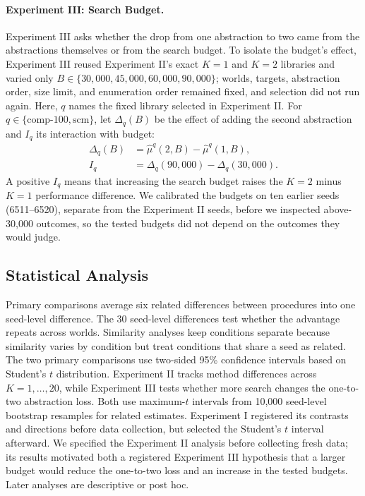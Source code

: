 \documentclass[10pt]{article}
\begin{document}
\paragraph{Experiment III: Search Budget.}
Experiment III asks whether the drop from one abstraction to two came from
the abstractions themselves or from the search budget. To isolate the
budget's effect, Experiment III reused Experiment II's exact $K=1$ and $K=2$
libraries and varied only $B\in\{30{,}000,45{,}000,60{,}000,90{,}000\}$;
worlds, targets, abstraction order, size limit, and enumeration order
remained fixed, and selection did not run again. Here, $q$ names the fixed
library selected in Experiment II. For
$q\in\{\mathrm{comp\text{-}100},\mathrm{scm}\}$, let $\Delta_q(B)$ be the
effect of adding the second abstraction and $I_q$ its interaction with
budget:
\begin{equation}
  \begin{aligned}
    \Delta_q(B)
      &=\widehat\mu^q(2,B)-\widehat\mu^q(1,B),\\
    I_q
      &=\Delta_q(90{,}000)-\Delta_q(30{,}000).
  \end{aligned}
\end{equation}
A positive $I_q$ means that increasing the search budget raises the $K=2$ minus
$K=1$ performance difference. We calibrated the budgets on ten earlier
seeds (6511--6520), separate from the Experiment II seeds, before we
inspected above-30,000 outcomes, so the tested budgets did not depend on the
outcomes they would judge.

\subsection{Statistical Analysis}

Primary comparisons average six related differences between procedures into
one seed-level difference. The 30 seed-level differences test whether the
advantage repeats across worlds. Similarity analyses keep conditions separate
because similarity varies by condition but treat conditions that share a seed
as related. The two primary comparisons use two-sided 95\% confidence
intervals based on Student's $t$ distribution. Experiment
II tracks method differences across $K=1,\ldots,20$, while Experiment III tests
whether more search changes the one-to-two abstraction loss. Both use maximum-$t$ intervals from 10,000
seed-level bootstrap resamples for related estimates. Experiment I registered
its contrasts and directions before data collection, but selected the
Student's $t$ interval afterward. We specified the Experiment II analysis before
collecting fresh data; its results motivated both a registered Experiment III
hypothesis that a larger budget would reduce the one-to-two loss and an increase
in the tested budgets. Later analyses are descriptive or post hoc.
\end{document}

